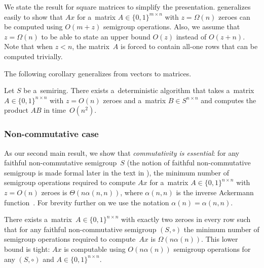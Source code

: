 %
We state the result for square matrices to simplify the presentation.
 generalizes easily to show that $Ax$ for a~matrix
$A \in \{0,1\}^{m \times n}$ with $z=\Omega(n)$ zeroes can be computed using
$O(m+z)$ semigroup operations. Also, we assume that $z=\Omega(n)$ to be able to
state an upper bound $O(z)$ instead of $O(z+n)$. Note that when $z<n$, the
matrix~$A$ is forced to contain all-one rows that can be computed trivially.

The following corollary generalizes 
from vectors to matrices.

\begin{corollary}
\label{cor:matrixmultiplicationold}
Let $S$ be a~semiring. There exists a~deterministic algorithm that takes a~matrix
\linebreak${A \in \{0,1\}^{n \times n}}$ with $z=O(n)$ zeroes and a~matrix
$B \in S^{n \times n}$ and computes the product $AB$ in time~$O(n^2)$.
\end{corollary}

\subsubsection{Non-commutative case}


As our second main result, we show that \emph{commutativity is essential}: for
any faithful non-commutative semigroup~$S$
%
%
(the notion of faithful non-commutative semigroup  is made formal
later in the text in %
), %
the minimum number of semigroup operations
required to compute $Ax$ for a~matrix
$A \in \{0,1\}^{n \times n}$ with $z=O(n)$ zeroes is
%
$\Theta(n\alpha(n,n))$, where $\alpha(n,n)$ is the inverse Ackermann function~\cite{Tarjan75}.
For brevity further on we use the notation $\alpha(n) = \alpha(n,n)$. %
%
%
%

%
%
%
%

\begin{theorem}
\label{thm:lowerboundold}
There exists
a~matrix~$A \in \{0,1\}^{n \times n}$ with exactly two zeroes
in every row such that for any faithful non-commutative semigroup $(S, \circ)$
the minimum number of semigroup operations required to compute~$Ax$ is
$\Omega(n\alpha(n))$.
This lower bound is tight: $Ax$ is	computable using $O(n\alpha(n))$ semigroup
operations for any $(S, \circ)$ and $A\in \{0,1\}^{n \times n}$.
\end{theorem}

%
%
%
%
%
%
%
%
%
%

